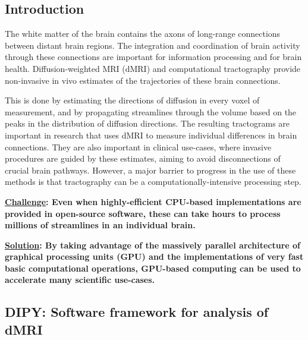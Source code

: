 \documentclass[a0, landscape]{a0poster}
\begin{document}
\begin{multicols}{3} %


\section*{Introduction}

The white matter of the brain contains the axons of long-range connections between distant brain regions. The integration and coordination of brain activity through these connections are important for information processing and for brain health. Diffusion-weighted MRI (dMRI) and computational tractography provide non-invasive in vivo estimates of the trajectories of these brain connections.

This is done by estimating the directions of diffusion in every voxel of measurement, and by propagating streamlines through the volume based on the peaks in the distribution of diffusion directions. The resulting tractograms are important in research that uses dMRI to measure individual differences in brain connections. They are also important in clinical use-cases, where invasive procedures are guided by these estimates, aiming to avoid disconnections of crucial brain pathways. However, a major barrier to progress in the use of these methods is that tractography can be a computationally-intensive processing step.

\vspace{0.5em}
\noindent\textbf{\underline{Challenge}: Even when highly-efficient CPU-based implementations are provided in open-source software, these can take hours to process millions of streamlines in an individual brain.}
\vspace{0.5em}

\noindent\textbf{\underline{Solution}: By taking advantage of the massively parallel architecture of graphical processing units (GPU) and the implementations of very fast basic computational operations, GPU-based computing can be used to accelerate many scientific use-cases.}
\vspace{0.5em}

\subsection*{DIPY: Software framework for analysis of dMRI \cite{Garyfallidis2014FrontNeuroinf}}


\end{multicols}
\end{document}
